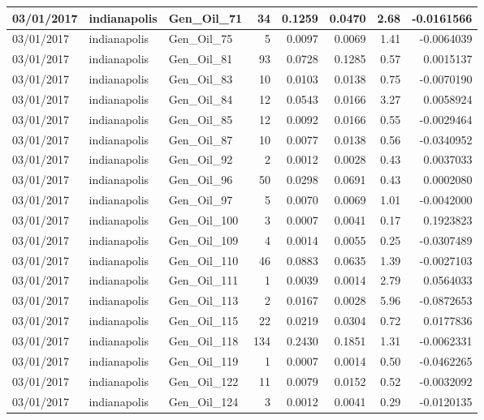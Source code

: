 \documentclass[
  letterpaper,
  DIV=11,
  numbers=noendperiod]{scrartcl}
\begin{document}
\begin{tabular}{l|l|l|r|r|r|r|r}
\hline
03/01/2017 & indianapolis & Gen\_Oil\_71 & 34 & 0.1259 & 0.0470 & 2.68 & -0.0161566\\
\hline
03/01/2017 & indianapolis & Gen\_Oil\_75 & 5 & 0.0097 & 0.0069 & 1.41 & -0.0064039\\
\hline
03/01/2017 & indianapolis & Gen\_Oil\_81 & 93 & 0.0728 & 0.1285 & 0.57 & 0.0015137\\
\hline
03/01/2017 & indianapolis & Gen\_Oil\_83 & 10 & 0.0103 & 0.0138 & 0.75 & -0.0070190\\
\hline
03/01/2017 & indianapolis & Gen\_Oil\_84 & 12 & 0.0543 & 0.0166 & 3.27 & 0.0058924\\
\hline
03/01/2017 & indianapolis & Gen\_Oil\_85 & 12 & 0.0092 & 0.0166 & 0.55 & -0.0029464\\
\hline
03/01/2017 & indianapolis & Gen\_Oil\_87 & 10 & 0.0077 & 0.0138 & 0.56 & -0.0340952\\
\hline
03/01/2017 & indianapolis & Gen\_Oil\_92 & 2 & 0.0012 & 0.0028 & 0.43 & 0.0037033\\
\hline
03/01/2017 & indianapolis & Gen\_Oil\_96 & 50 & 0.0298 & 0.0691 & 0.43 & 0.0002080\\
\hline
03/01/2017 & indianapolis & Gen\_Oil\_97 & 5 & 0.0070 & 0.0069 & 1.01 & -0.0042000\\
\hline
03/01/2017 & indianapolis & Gen\_Oil\_100 & 3 & 0.0007 & 0.0041 & 0.17 & 0.1923823\\
\hline
03/01/2017 & indianapolis & Gen\_Oil\_109 & 4 & 0.0014 & 0.0055 & 0.25 & -0.0307489\\
\hline
03/01/2017 & indianapolis & Gen\_Oil\_110 & 46 & 0.0883 & 0.0635 & 1.39 & -0.0027103\\
\hline
03/01/2017 & indianapolis & Gen\_Oil\_111 & 1 & 0.0039 & 0.0014 & 2.79 & 0.0564033\\
\hline
03/01/2017 & indianapolis & Gen\_Oil\_113 & 2 & 0.0167 & 0.0028 & 5.96 & -0.0872653\\
\hline
03/01/2017 & indianapolis & Gen\_Oil\_115 & 22 & 0.0219 & 0.0304 & 0.72 & 0.0177836\\
\hline
03/01/2017 & indianapolis & Gen\_Oil\_118 & 134 & 0.2430 & 0.1851 & 1.31 & -0.0062331\\
\hline
03/01/2017 & indianapolis & Gen\_Oil\_119 & 1 & 0.0007 & 0.0014 & 0.50 & -0.0462265\\
\hline
03/01/2017 & indianapolis & Gen\_Oil\_122 & 11 & 0.0079 & 0.0152 & 0.52 & -0.0032092\\
\hline
03/01/2017 & indianapolis & Gen\_Oil\_124 & 3 & 0.0012 & 0.0041 & 0.29 & -0.0120135\\

\end{tabular}
\end{document}
